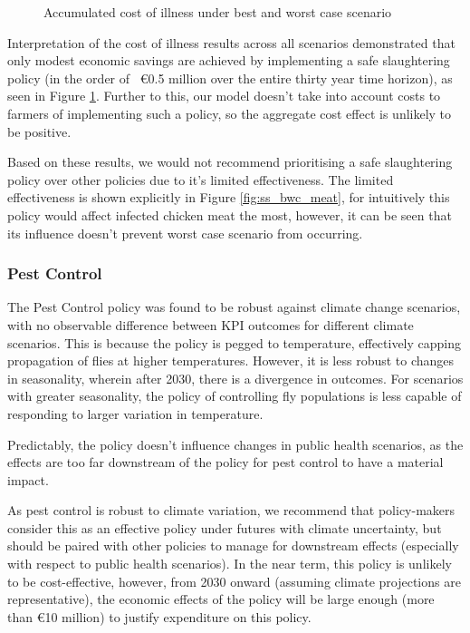 \begin{figure}[h!]
\begin{minipage}{0.45\textwidth}
        \caption{Accumulated cost of illness under best and worst case scenario}
        \label{fig:ss_bwc_acoi}
    \end{minipage}
\end{figure}


Interpretation of the cost of illness results across all scenarios demonstrated that only modest economic savings are achieved by implementing a safe slaughtering policy (in the order of ~€0.5 million over the entire thirty year time horizon), as seen in Figure \ref{fig:ss_bwc_acoi}. Further to this, our model doesn't take into account costs to farmers of implementing such a policy, so the aggregate cost effect is unlikely to be positive.

Based on these results, we would not recommend prioritising a safe slaughtering policy over other policies due to it's limited effectiveness. The limited effectiveness is shown explicitly in Figure \ref{fig:ss_bwc_meat}, for intuitively this policy would affect infected chicken meat the most, however, it can be seen that its influence doesn't prevent worst case scenario from occurring. 

\subsubsection{Pest Control}
\label{sec: pest control}
The Pest Control policy was found to be robust against climate change scenarios, with no observable difference between KPI outcomes for different climate scenarios. This is because the policy is pegged to temperature, effectively capping propagation of flies at higher temperatures. However, it is less robust to changes in seasonality, wherein after 2030, there is a divergence in outcomes. For scenarios with greater seasonality, the policy of controlling fly populations is less capable of responding to larger variation in temperature.

Predictably, the policy doesn't influence changes in public health scenarios, as the effects are too far downstream of the policy for pest control to have a material impact.

As pest control is robust to climate variation, we recommend that policy-makers consider this as an effective policy under futures with climate uncertainty, but should be paired with other policies to manage for downstream effects (especially with respect to public health scenarios). In the near term, this policy is unlikely to be cost-effective, however, from 2030 onward (assuming climate projections are representative), the economic effects of the policy will be large enough (more than €10 million) to justify expenditure on this policy.


